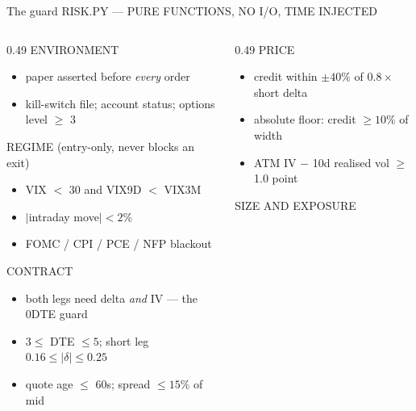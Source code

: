 \documentclass[aspectratio=169,10pt]{beamer}
\newcommand{\eyebrow}[1]{{\ttfamily\scriptsize\textcolor{soft}{\MakeUppercase{#1}}}\par\vspace{0.22em}}
\begin{document}
\begin{frame}[t]{The guard}
  \eyebrow{risk.py --- pure functions, no I/O, time injected}

  \footnotesize
  \begin{columns}[T]
    \begin{column}{0.49\textwidth}
      \textcolor{soft}{\ttfamily\scriptsize ENVIRONMENT}
      \begin{itemize}\itemsep1pt
        \item paper asserted before \emph{every} order
        \item kill-switch file; account status; options level $\geq$ 3
      \end{itemize}
      \vspace{0.22em}
      \textcolor{soft}{\ttfamily\scriptsize REGIME (entry-only, never blocks an exit)}
      \begin{itemize}\itemsep1pt
        \item VIX $<$ 30 and VIX9D $<$ VIX3M
        \item $|$intraday move$| < 2\%$
        \item FOMC / CPI / PCE / NFP blackout
      \end{itemize}
      \vspace{0.22em}
      \textcolor{soft}{\ttfamily\scriptsize CONTRACT}
      \begin{itemize}\itemsep1pt
        \item both legs need delta \emph{and} IV --- the 0DTE guard
        \item $3 \leq$ DTE $\leq 5$; short leg $0.16 \leq |\delta| \leq 0.25$
        \item quote age $\leq$ 60s; spread $\leq 15\%$ of mid
      \end{itemize}
    \end{column}
    \begin{column}{0.49\textwidth}
      \textcolor{soft}{\ttfamily\scriptsize PRICE}
      \begin{itemize}\itemsep1pt
        \item credit within $\pm40\%$ of $0.8 \times$ short delta
        \item absolute floor: credit $\geq 10\%$ of width
        \item ATM IV $-$ 10d realised vol $\geq$ 1.0 point
      \end{itemize}
      \vspace{0.22em}
      \textcolor{soft}{\ttfamily\scriptsize SIZE AND EXPOSURE}

\end{column}
\end{columns}
\end{frame}
\end{document}
